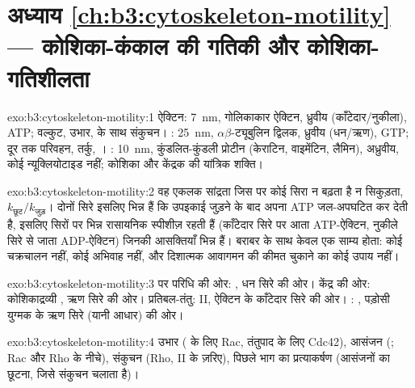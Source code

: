 \section*{अध्याय \ref{ch:b3:cytoskeleton-motility} --- कोशिका-कंकाल की गतिकी और कोशिका-गतिशीलता}

\begin{solution}{exo:b3:cytoskeleton-motility:1}
ऐक्टिन: \qty{7}{nm}, गोलिकाकार ऐक्टिन, ध्रुवीय (काँटेदार/नुकीला), ATP;
वल्कुट, उभार,  के साथ संकुचन। : \qty{25}{nm},
$\alpha\beta$-ट्यूबुलिन द्विलक, ध्रुवीय (धन/ऋण), GTP; दूर तक
परिवहन, तर्कु, । : \qty{10}{nm},
कुंडलित-कुंडली प्रोटीन (केराटिन, वाइमेंटिन, लैमिन), अध्रुवीय, कोई
न्यूक्लियोटाइड नहीं; कोशिका और केंद्रक की यांत्रिक शक्ति।
\end{solution}

\begin{solution}{exo:b3:cytoskeleton-motility:2}
वह एकलक सांद्रता जिस पर कोई सिरा न बढ़ता है न सिकुड़ता,
$k_{\text{छूट}}/k_{\text{जुड़}}$। दोनों सिरे इसलिए भिन्न हैं कि उपइकाई
जुड़ने के बाद अपना ATP जल-अपघटित कर देती है, इसलिए सिरों पर भिन्न
रासायनिक स्पीशीज़ रहती हैं (काँटेदार सिरे पर आता ATP-ऐक्टिन, नुकीले
सिरे से जाता ADP-ऐक्टिन) जिनकी आसक्तियाँ भिन्न हैं। बराबर  के साथ केवल एक साम्य होता: कोई चक्रचालन नहीं, कोई अभिवाह
नहीं, और दिशात्मक आवागमन की कीमत चुकाने का कोई उपाय नहीं।
\end{solution}

\begin{solution}{exo:b3:cytoskeleton-motility:3}
 पर परिधि की ओर: , धन सिरे की ओर। केंद्र की ओर:
कोशिकाद्रव्यी , ऋण सिरे की ओर। प्रतिबल-तंतु:  II,
ऐक्टिन के काँटेदार सिरे की ओर। : , पड़ोसी
युग्मक के ऋण सिरे (यानी आधार) की ओर।
\end{solution}

\begin{solution}{exo:b3:cytoskeleton-motility:4}
उभार ( के लिए Rac, तंतुपाद के लिए Cdc42), आसंजन
(; Rac और Rho के नीचे), संकुचन (Rho,  II के ज़रिए),
पिछले भाग का प्रत्याकर्षण (आसंजनों का छूटना, जिसे संकुचन चलाता है)।
\end{solution}

